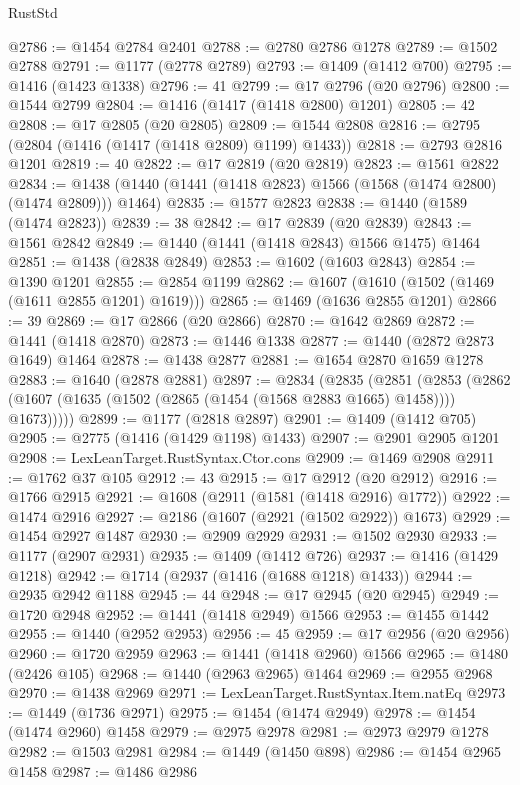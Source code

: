 \begin{lexlean}{RustStd}
\begin{coremodule}
@2786 := @1454 @2784 @2401
@2788 := @2780 @2786 @1278
@2789 := @1502 @2788
@2791 := @1177 (@2778 @2789)
@2793 := @1409 (@1412 @700)
@2795 := @1416 (@1423 @1338)
@2796 := 41
@2799 := @17 @2796 (@20 @2796)
@2800 := @1544 @2799
@2804 := @1416 (@1417 (@1418 @2800) @1201)
@2805 := 42
@2808 := @17 @2805 (@20 @2805)
@2809 := @1544 @2808
@2816 := @2795 (@2804 (@1416 (@1417 (@1418 @2809) @1199) @1433))
@2818 := @2793 @2816 @1201
@2819 := 40
@2822 := @17 @2819 (@20 @2819)
@2823 := @1561 @2822
@2834 := @1438 (@1440 (@1441 (@1418 @2823) @1566 (@1568 (@1474 @2800) (@1474 @2809))) @1464)
@2835 := @1577 @2823
@2838 := @1440 (@1589 (@1474 @2823))
@2839 := 38
@2842 := @17 @2839 (@20 @2839)
@2843 := @1561 @2842
@2849 := @1440 (@1441 (@1418 @2843) @1566 @1475) @1464
@2851 := @1438 (@2838 @2849)
@2853 := @1602 (@1603 @2843)
@2854 := @1390 @1201
@2855 := @2854 @1199
@2862 := @1607 (@1610 (@1502 (@1469 (@1611 @2855 @1201) @1619)))
@2865 := @1469 (@1636 @2855 @1201)
@2866 := 39
@2869 := @17 @2866 (@20 @2866)
@2870 := @1642 @2869
@2872 := @1441 (@1418 @2870)
@2873 := @1446 @1338
@2877 := @1440 (@2872 @2873 @1649) @1464
@2878 := @1438 @2877
@2881 := @1654 @2870 @1659 @1278
@2883 := @1640 (@2878 @2881)
@2897 := @2834
    (@2835
      (@2851
        (@2853 (@2862 (@1607 (@1635 (@1502 (@2865 (@1454 (@1568 @2883 @1665) @1458)))) @1673)))))
@2899 := @1177 (@2818 @2897)
@2901 := @1409 (@1412 @705)
@2905 := @2775 (@1416 (@1429 @1198) @1433)
@2907 := @2901 @2905 @1201
@2908 := LexLeanTarget.RustSyntax.Ctor.cons
@2909 := @1469 @2908
@2911 := @1762 @37 @105
@2912 := 43
@2915 := @17 @2912 (@20 @2912)
@2916 := @1766 @2915
@2921 := @1608 (@2911 (@1581 (@1418 @2916) @1772))
@2922 := @1474 @2916
@2927 := @2186 (@1607 (@2921 (@1502 @2922)) @1673)
@2929 := @1454 @2927 @1487
@2930 := @2909 @2929
@2931 := @1502 @2930
@2933 := @1177 (@2907 @2931)
@2935 := @1409 (@1412 @726)
@2937 := @1416 (@1429 @1218)
@2942 := @1714 (@2937 (@1416 (@1688 @1218) @1433))
@2944 := @2935 @2942 @1188
@2945 := 44
@2948 := @17 @2945 (@20 @2945)
@2949 := @1720 @2948
@2952 := @1441 (@1418 @2949) @1566
@2953 := @1455 @1442
@2955 := @1440 (@2952 @2953)
@2956 := 45
@2959 := @17 @2956 (@20 @2956)
@2960 := @1720 @2959
@2963 := @1441 (@1418 @2960) @1566
@2965 := @1480 (@2426 @105)
@2968 := @1440 (@2963 @2965) @1464
@2969 := @2955 @2968
@2970 := @1438 @2969
@2971 := LexLeanTarget.RustSyntax.Item.natEq
@2973 := @1449 (@1736 @2971)
@2975 := @1454 (@1474 @2949)
@2978 := @1454 (@1474 @2960) @1458
@2979 := @2975 @2978
@2981 := @2973 @2979 @1278
@2982 := @1503 @2981
@2984 := @1449 (@1450 @898)
@2986 := @1454 @2965 @1458
@2987 := @1486 @2986

\end{coremodule}
\end{lexlean}
